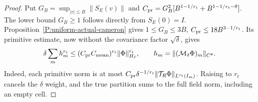 \begin{proof}
  Put $G_B=\sup_{|v|\le B}\|S_E(v)\|$ and
  $C_{\rm pr}=G_B^2[B^{1-1/r_t}+B^{1-1/r_t-\theta}]$.
  The lower bound $G_B\ge1$ follows directly from $S_E(0)=I$.
  Proposition~\ref{P:uniform-actual-cameron} gives
  $1\le G_B\le3B$, $C_{\rm pr}\le18B^{3-1/r_t}$.
  Its primitive estimate, now without the covariance factor
  $\sqrt\delta$, gives
  \begin{equation}\label{E:tube-primitive-sum}
    \delta\sum_m h_m^{r_t}
    \le(C_{\rm pr}C_{\rm mean})^{r_t}\|\Phi\|_{H_I}^{r_t},
    \qquad h_m=\|(\mathcal M_\delta\Phi)_m\|_{C^\theta}.
  \end{equation}
  Indeed, each primitive norm is at most
  $C_{\rm pr}\delta^{-1/r_t}
  \|\mathcal T_R\Phi\|_{L^{r_t}(I_m)}$.
  Raising to $r_t$ cancels the $\delta$ weight, and the true
  partition sums to the full field norm, including an empty cell.


\end{proof}
